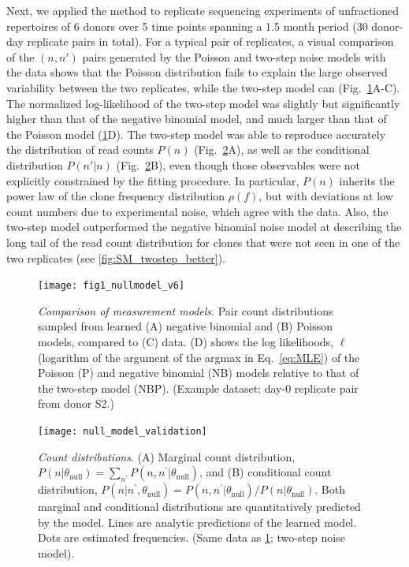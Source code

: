 \documentclass[pre,twocolumn,english,longbibliography]{revtex4}
\newcommand{\<}{\langle}
\renewcommand{\>}{\rangle}
\begin{document}
Next, we applied the method to replicate sequencing experiments of unfractioned repertoires of 6 donors over 5 time points spanning a 1.5 month period (30 donor-day replicate pairs in total). For a typical pair of replicates, a visual comparison of the $(n,n')$ pairs generated by the Poisson and two-step noise models with the data shows that the Poisson distribution fails to explain the large observed variability between the two replicates, while the two-step model can (Fig.~\ref{fig:nullstats}A-C). The normalized log-likelihood of the two-step model was slightly but significantly higher than that of the negative binomial model, and much larger than that of the Poisson model (\cref{fig:nullstats}D). The two-step model was able to reproduce accurately the distribution of read counts $P(n)$ (Fig.~\ref{fig:modelfit}A), as well as the conditional distribution $P(n'|n)$ (Fig.~\ref{fig:modelfit}B), even though those observables were not explicitly constrained by the fitting procedure. In particular, $P(n)$ inherits the power law of the clone frequency distribution $\rho(f)$, but with deviations at low count numbers due to experimental noise, which agree with the data. 
Also, the two-step model outperformed the negative binomial noise model at describing the long tail of the read count distribution for clones that were not seen in one of the two replicates (see \cref{fig:SM_twostep_better}). 

\begin{figure}
\texttt{[image: fig1\_nullmodel\_v6]}
\centering{}
\caption{
  \emph{Comparison of measurement models}. Pair count distributions sampled from learned (A) negative binomial and (B) Poisson models, compared to (C) data. (D) shows the log likelihoods, $\ell$ (logarithm of the argument of the argmax in Eq.~\ref{eq:MLE}) of the Poisson (P) and negative binomial (NB) models relative to that of the two-step model (NBP). (Example dataset: day-0 replicate pair from donor S2.)  \label{fig:nullstats}
  }
\end{figure}

\begin{figure}
\texttt{[image: null\_model\_validation]}
\centering{}
\caption{
  \emph{Count distributions}. (A) Marginal count distribution, $P(n|\theta_{\textrm{null}})=\sum_{n^{\prime}}P(n,n^{\prime}|\theta_{\textrm{null}})$, and (B) conditional count distribution, $P(n|n^{\prime},\theta_{\textrm{null}})=P(n,n^{\prime}|\theta_{\textrm{null}})/P(n|\theta_{\textrm{null}})$. Both marginal and conditional distributions are quantitatively predicted by the model. Lines are analytic predictions of the learned model. Dots are estimated frequencies. (Same data as \cref{fig:nullstats}; two-step noise model).
\label{fig:modelfit}}
\end{figure}
\end{document}
